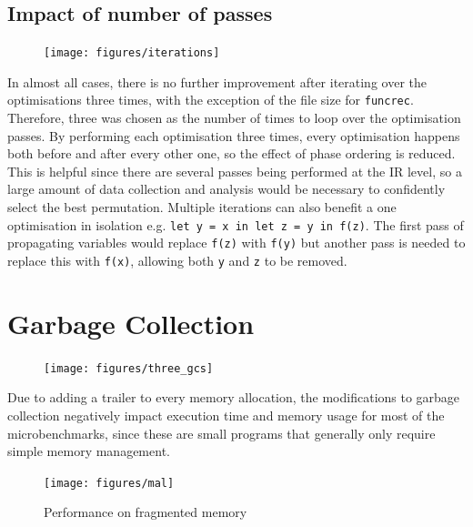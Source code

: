 \subsection{Impact of number of passes}

\begin{figure}[H]
\texttt{[image: figures/iterations]}
 \label{fig:iterations} 
\end{figure}

In almost all cases, there is no further improvement after iterating over the optimisations three times, with the exception of the file size for \verb|funcrec|. Therefore, three was chosen as the number of times to loop over the optimisation passes. By performing each optimisation three times, every optimisation happens both before and after every other one, so the effect of phase ordering is reduced. This is helpful since there are several passes being performed at the IR level, so a large amount of data collection and analysis  would be necessary to confidently select the best permutation. 
Multiple iterations can also benefit a one optimisation in isolation e.g. \verb|let y = x in let z = y in f(z)|. The first pass of propagating variables would replace \verb|f(z)| with \verb|f(y)| but another pass is needed to replace this with \verb|f(x)|, allowing both \verb|y| and \verb|z| to be removed.




\section{Garbage Collection}

\begin{figure}[H]
\hspace{-3.3cm}
\vspace{-0.5cm}
\texttt{[image: figures/three\_gcs]}
 \label{fig:three_gcs} 
\end{figure}

Due to adding a trailer to every memory allocation, the modifications to garbage collection negatively impact execution time and memory usage for most of the microbenchmarks, since these are small programs that generally only require simple memory management. 

\begin{figure}[H]
\hfill \texttt{[image: figures/mal]} \hfill
\caption{Performance on fragmented memory}
 \label{fig:mal} 
\end{figure}

